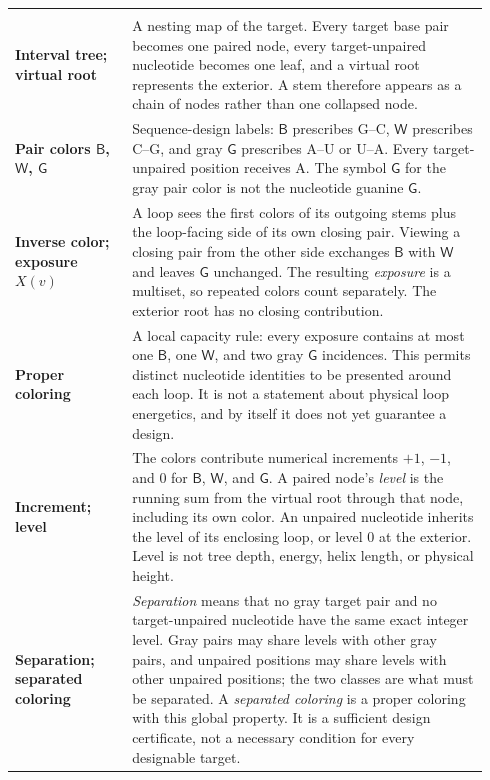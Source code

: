 \documentclass[11pt]{article}
\newcommand{\G}{\textsf{G}}
\newcommand{\Bcol}{\mathsf{B}}
\newcommand{\Wcol}{\mathsf{W}}
\newcommand{\Gray}{\mathsf{G}}
\begin{document}
{\begin{longtable}{@{}>{\raggedright\arraybackslash\bfseries}p{0.235\linewidth}>{\raggedright\arraybackslash}p{0.705\linewidth}@{}}
\midrule
\multicolumn{2}{@{}l}{\textcolor{DeepBlue}{\bfseries The coloring certificate}}\\
\addlinespace[2pt]
Interval tree; virtual root & A nesting map of the target.  Every target base pair becomes one paired node, every target-unpaired nucleotide becomes one leaf, and a virtual root represents the exterior.  A stem therefore appears as a chain of nodes rather than one collapsed node. \\
\addlinespace[3pt]
Pair colors $\Bcol$, $\Wcol$, $\Gray$ & Sequence-design labels: $\Bcol$ prescribes G--C, $\Wcol$ prescribes C--G, and gray $\Gray$ prescribes A--U or U--A.  Every target-unpaired position receives A.  The symbol $\Gray$ for the gray pair color is not the nucleotide guanine $\G$. \\
\addlinespace[3pt]
Inverse color; exposure $X(v)$ & A loop sees the first colors of its outgoing stems plus the loop-facing side of its own closing pair.  Viewing a closing pair from the other side exchanges $\Bcol$ with $\Wcol$ and leaves $\Gray$ unchanged.  The resulting \emph{exposure} is a multiset, so repeated colors count separately.  The exterior root has no closing contribution. \\
\addlinespace[3pt]
Proper coloring & A local capacity rule: every exposure contains at most one $\Bcol$, one $\Wcol$, and two gray $\Gray$ incidences.  This permits distinct nucleotide identities to be presented around each loop.  It is not a statement about physical loop energetics, and by itself it does not yet guarantee a design. \\
\addlinespace[3pt]
Increment; level & The colors contribute numerical increments $+1$, $-1$, and $0$ for $\Bcol$, $\Wcol$, and $\Gray$.  A paired node's \emph{level} is the running sum from the virtual root through that node, including its own color.  An unpaired nucleotide inherits the level of its enclosing loop, or level $0$ at the exterior.  Level is not tree depth, energy, helix length, or physical height. \\
\addlinespace[3pt]
Separation; separated coloring & \emph{Separation} means that no gray target pair and no target-unpaired nucleotide have the same exact integer level.  Gray pairs may share levels with other gray pairs, and unpaired positions may share levels with other unpaired positions; the two classes are what must be separated.  A \emph{separated coloring} is a proper coloring with this global property.  It is a sufficient design certificate, not a necessary condition for every designable target. \\

\end{longtable}}
\end{document}
